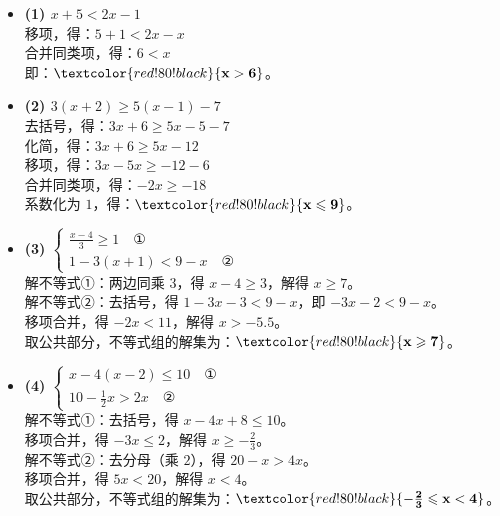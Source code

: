 \documentclass[12pt, a4paper]{ctexrep}
\begin{document}
\begin{itemize}
    \item \textbf{(1) $x + 5 < 2x - 1$} \\
    移项，得：$5 + 1 < 2x - x$ \\
    合并同类项，得：$6 < x$ \\
    即：$\textcolor{red!80!black}{\mathbf{x > 6}}$。

    \vspace{0.2cm}
    \item \textbf{(2) $3(x + 2) \geqslant 5(x - 1) - 7$} \\
    去括号，得：$3x + 6 \geqslant 5x - 5 - 7$ \\
    化简，得：$3x + 6 \geqslant 5x - 12$ \\
    移项，得：$3x - 5x \geqslant -12 - 6$ \\
    合并同类项，得：$-2x \geqslant -18$ \\
    系数化为 $1$，得：$\textcolor{red!80!black}{\mathbf{x \leqslant 9}}$。

    \vspace{0.2cm}
    \item \textbf{(3) $\begin{cases} \frac{x - 4}{3} \geqslant 1 \quad \text{①} \\ 1 - 3(x + 1) < 9 - x \quad \text{②} \end{cases}$} \\
    解不等式①：两边同乘 $3$，得 $x - 4 \geqslant 3$，解得 $x \geqslant 7$。 \\
    解不等式②：去括号，得 $1 - 3x - 3 < 9 - x$，即 $-3x - 2 < 9 - x$。 \\
    移项合并，得 $-2x < 11$，解得 $x > -5.5$。 \\
    取公共部分，不等式组的解集为：$\textcolor{red!80!black}{\mathbf{x \geqslant 7}}$。

    \vspace{0.2cm}
    \item \textbf{(4) $\begin{cases} x - 4(x - 2) \leqslant 10 \quad \text{①} \\ 10 - \frac{1}{2}x > 2x \quad \text{②} \end{cases}$} \\
    解不等式①：去括号，得 $x - 4x + 8 \leqslant 10$。 \\
    移项合并，得 $-3x \leqslant 2$，解得 $x \geqslant -\frac{2}{3}$。 \\
    解不等式②：去分母（乘 $2$），得 $20 - x > 4x$。 \\
    移项合并，得 $5x < 20$，解得 $x < 4$。 \\
    取公共部分，不等式组的解集为：$\textcolor{red!80!black}{\mathbf{-\frac{2}{3} \leqslant x < 4}}$。
\end{itemize}
\end{document}
